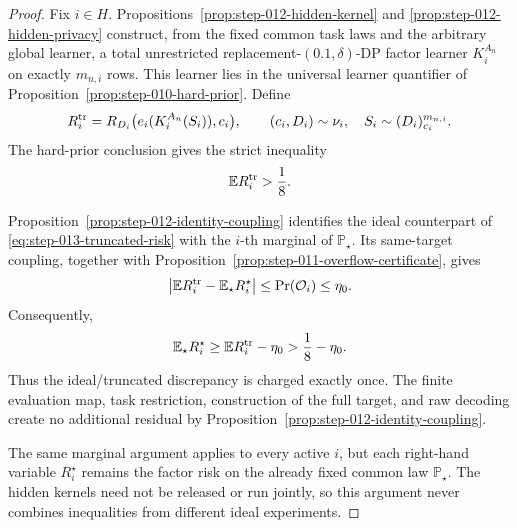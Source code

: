 \begin{proof}
Fix \(i\in H\).  Propositions~\ref{prop:step-012-hidden-kernel} and
\ref{prop:step-012-hidden-privacy} construct, from the fixed common task
laws and the arbitrary global learner, a total unrestricted
replacement-\((0.1,\delta)\)-DP factor learner \(K_i^{A_n}\) on exactly
\(m_{n,i}\) rows.  This learner lies in the universal learner
quantifier of Proposition~\ref{prop:step-010-hard-prior}.  Define
\begin{equation}\label{eq:step-013-truncated-risk}
R_i^{\rm tr}
=R_{D_i}\bigl(e_i(K_i^{A_n}(S_i)),c_i\bigr),
\qquad
(c_i,D_i)\sim\nu_i,
\quad
S_i\sim(D_i)_{c_i}^{m_{n,i}}.
\end{equation}
The hard-prior conclusion gives the strict inequality
\begin{equation}\label{eq:step-013-truncated-floor}
\mathbb E R_i^{\rm tr}>\frac18.
\end{equation}

Proposition~\ref{prop:step-012-identity-coupling} identifies the ideal
counterpart of \eqref{eq:step-013-truncated-risk} with the \(i\)-th
marginal of \(\mathbb P_\star\).  Its same-target coupling, together
with Proposition~\ref{prop:step-011-overflow-certificate}, gives
\begin{equation}\label{eq:step-013-marginal-coupling}
\left|\mathbb E R_i^{\rm tr}
      -\mathbb E_\star R_i^\star\right|
\le \Pr(\mathcal O_i)
\le\eta_0.
\end{equation}
Consequently,
\begin{equation}\label{eq:step-013-floor-transfer}
\mathbb E_\star R_i^\star
\ge \mathbb E R_i^{\rm tr}-\eta_0
>\frac18-\eta_0.
\end{equation}
Thus the ideal/truncated discrepancy is charged exactly once.  The
finite evaluation map, task restriction, construction of the full target, and raw
decoding create no additional residual by
Proposition~\ref{prop:step-012-identity-coupling}.

The same marginal argument applies to every active \(i\), but each
right-hand variable \(R_i^\star\) remains the factor risk on the
already fixed common law \(\mathbb P_\star\).  The hidden kernels need
not be released or run jointly, so this argument never combines
inequalities from different ideal experiments.
\end{proof}


